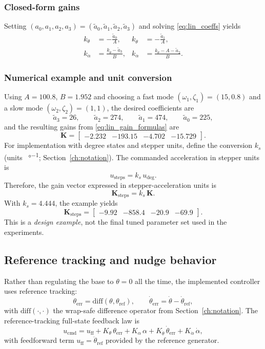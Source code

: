 \subsubsection{Closed-form gains}
Setting $(a_0,a_1,a_2,a_3)=(\tilde a_0,\tilde a_1,\tilde a_2,\tilde a_3)$ and solving \eqref{eq:lin_coeffs} yields
\begin{align}
k_{\theta} &= -\frac{\tilde a_0}{A}, &
k_{\dot{\theta}} &= -\frac{\tilde a_1}{A},\nonumber\\
k_{\dot{\alpha}} &= \frac{k_{\dot{\theta}}-\tilde a_3}{B}, &
k_{\alpha} &= \frac{k_{\theta}-A-\tilde a_2}{B}.
\label{eq:lin_gain_formulas}
\end{align}

\subsubsection{Numerical example and unit conversion}
Using $A=100.8$, $B=1.952$ and choosing a fast mode $(\omega_1,\zeta_1)=(15,0.8)$ and a slow mode $(\omega_2,\zeta_2)=(1,1)$, the desired coefficients are
\[
\tilde a_3=26,\qquad \tilde a_2=274,\qquad \tilde a_1=474,\qquad \tilde a_0=225,
\]
and the resulting gains from \eqref{eq:lin_gain_formulas} are
\[
\mathbf{K}=\begin{bmatrix}
-2.232 & -193.15 & -4.702 & -15.729
\end{bmatrix}.
\]
For implementation with degree states and stepper units, define the conversion $k_s$ (units \si{\step\per\degree}; Section~\ref{ch:notation}). The commanded acceleration in stepper units is
\[
u_{\mathrm{steps}} = k_s\,u_{\deg}.
\]
Therefore, the gain vector expressed in stepper-acceleration units is
\[
\mathbf{K}_{\mathrm{steps}} = k_s\,\mathbf{K}.
\]
With $k_s=4.444$, the example yields
\[
\mathbf{K}_{\mathrm{steps}}=
\begin{bmatrix}
-9.92 & -858.4 & -20.9 & -69.9
\end{bmatrix}.
\]
This is a \emph{design example}, not the final tuned parameter set used in the experiments.

\subsection{Reference tracking and nudge behavior}
Rather than regulating the base to $\theta=0$ all the time, the implemented controller uses reference tracking:
\[
\theta_{\mathrm{err}} = \mathrm{diff}(\theta,\theta_{\mathrm{ref}}),\qquad
\dot{\theta}_{\mathrm{err}} = \dot{\theta} - \dot{\theta}_{\mathrm{ref}},
\]
with $\mathrm{diff}(\cdot,\cdot)$ the wrap-safe difference operator from Section~\ref{ch:notation}. The reference-tracking full-state feedback law is
\begin{equation}
u_{\mathrm{cmd}} =
u_{\mathrm{ff}} +
K_\theta\,\theta_{\mathrm{err}} + K_\alpha\,\alpha +
K_{\dot{\theta}}\,\dot{\theta}_{\mathrm{err}} + K_{\dot{\alpha}}\,\dot{\alpha},
\label{eq:lin_ref_tracking}
\end{equation}
with feedforward term $u_{\mathrm{ff}}=\ddot{\theta}_{\mathrm{ref}}$ provided by the reference generator.

